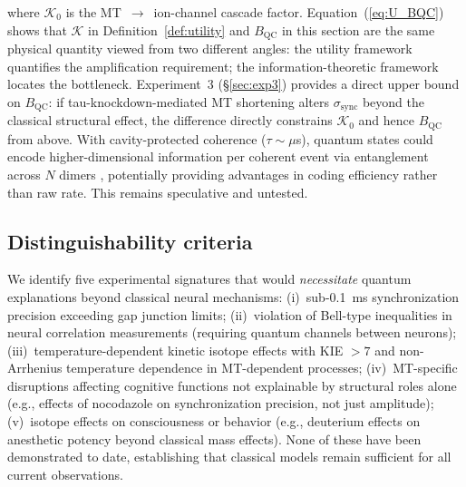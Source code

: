 \documentclass[twocolumn,10pt]{article}
\begin{document}
where $\mathcal{K}_0$ is the MT~$\to$~ion-channel cascade factor.
Equation~(\ref{eq:U_BQC}) shows that $\mathcal{K}$ in
Definition~\ref{def:utility} and $B_{\text{QC}}$ in this section are
the same physical quantity viewed from two different angles: the
utility framework quantifies the amplification requirement;
the information-theoretic framework locates the bottleneck.
Experiment~3 (\S\ref{sec:exp3}) provides a direct upper bound on
$B_{\text{QC}}$: if tau-knockdown-mediated MT shortening alters
$\sigma_{\text{sync}}$ beyond the classical structural effect,
the difference directly constrains $\mathcal{K}_0$ and hence
$B_{\text{QC}}$ from above.
With cavity-protected coherence ($\tau \sim \mu$s), quantum states could
encode higher-dimensional information per coherent event via entanglement
across $N$ dimers \cite{Giovannetti2004}, potentially providing advantages
in coding efficiency rather than raw rate. This remains speculative and
untested.

\subsection{Distinguishability criteria}
We identify five experimental signatures that would \textit{necessitate}
quantum explanations beyond classical neural mechanisms:
(i)~sub-0.1~ms synchronization precision exceeding gap junction limits;
(ii)~violation of Bell-type inequalities in neural correlation
measurements (requiring quantum channels between neurons);
(iii)~temperature-dependent kinetic isotope effects with KIE $> 7$ and
non-Arrhenius temperature dependence in MT-dependent processes;
(iv)~MT-specific disruptions affecting cognitive functions not explainable
by structural roles alone (e.g., effects of nocodazole on synchronization
precision, not just amplitude);
(v)~isotope effects on consciousness or behavior (e.g., deuterium effects
on anesthetic potency beyond classical mass effects).
None of these have been demonstrated to date, establishing that classical
models remain sufficient for all current observations.

\end{document}
